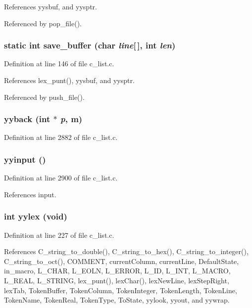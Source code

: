 References yysbuf, and yysptr.

Referenced by pop\_\-file().
\subsubsection{\setlength{\rightskip}{0pt plus 5cm}static int save\_\-buffer (char {\em line}[$\,$], int {\em len})\hspace{0.3cm}{\tt  [static]}}\label{c__list_8c_ba2fe5b5bfbb85834382f791b05efa87}




Definition at line 146 of file c\_\-list.c.

References lex\_\-punt(), yysbuf, and yysptr.

Referenced by push\_\-file().
\subsubsection{\setlength{\rightskip}{0pt plus 5cm}yyback (int $\ast$ {\em p}, m)}\label{c__list_8c_7e7fd61eff95f28431f23795998f2c8e}




Definition at line 2882 of file c\_\-list.c.
\subsubsection{\setlength{\rightskip}{0pt plus 5cm}yyinput ()}\label{c__list_8c_4899c6bb0b1b5863637b480d7901f4ae}




Definition at line 2900 of file c\_\-list.c.

References input.
\subsubsection{\setlength{\rightskip}{0pt plus 5cm}int yylex (void)}\label{c__list_8c_9a7bd1b3d14701eb97c03f3ef34deff1}




Definition at line 227 of file c\_\-list.c.

References C\_\-string\_\-to\_\-double(), C\_\-string\_\-to\_\-hex(), C\_\-string\_\-to\_\-integer(), C\_\-string\_\-to\_\-oct(), COMMENT, current\-Column, current\-Line, Default\-State, in\_\-macro, L\_\-CHAR, L\_\-EOLN, L\_\-ERROR, L\_\-ID, L\_\-INT, L\_\-MACRO, L\_\-REAL, L\_\-STRING, lex\_\-punt(), lex\-Char(), lex\-New\-Line, lex\-Step\-Right, lex\-Tab, Token\-Buffer, Token\-Column, Token\-Integer, Token\-Length, Token\-Line, Token\-Name, Token\-Real, Token\-Type, To\-State, yylook, yyout, and yywrap.

